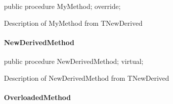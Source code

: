 \documentclass{report}
\begin{document}
\begin{list}{}{
\setlength{\itemindent}{0cm}
\setlength{\listparindent}{0cm}
\setlength{\leftmargin}{\evensidemargin}
\addtolength{\leftmargin}{\tmplength}
\settowidth{\labelsep}{X}
\addtolength{\leftmargin}{\labelsep}
\setlength{\labelwidth}{\tmplength}
}
\begin{flushleft}
\item[\textbf{Declaration}\hfill]
\begin{ttfamily}
public procedure MyMethod; override;\end{ttfamily}


\end{flushleft}
\par
\item[\textbf{Description}]
Description of MyMethod from TNewDerived

\end{list}
\paragraph*{NewDerivedMethod}\hspace*{\fill}

\begin{list}{}{
\setlength{\itemindent}{0cm}
\setlength{\listparindent}{0cm}
\setlength{\leftmargin}{\evensidemargin}
\addtolength{\leftmargin}{\tmplength}
\settowidth{\labelsep}{X}
\addtolength{\leftmargin}{\labelsep}
\setlength{\labelwidth}{\tmplength}
}
\begin{flushleft}
\item[\textbf{Declaration}\hfill]
\begin{ttfamily}
public procedure NewDerivedMethod; virtual;\end{ttfamily}


\end{flushleft}
\par
\item[\textbf{Description}]
Description of NewDerivedMethod from TNewDerived

\end{list}
\paragraph*{OverloadedMethod}\hspace*{\fill}
\end{document}
